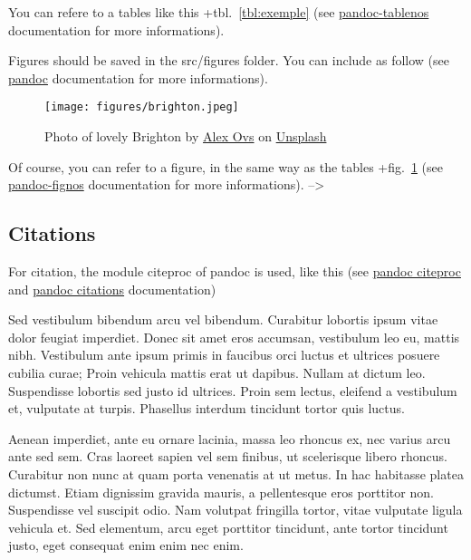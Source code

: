 \documentclass[9pt,biorxiv,doublespacing,lineno]{lapreprint}
\newcounter{tableno}
\begin{document}
You can refere to a tables like this +tbl.~\ref{tbl:exemple} (see
\href{https://github.com/tomduck/pandoc-tablenos}{pandoc-tablenos}
documentation for more informations).

Figures should be saved in the src/figures folder. You can include as
follow (see
\href{https://pandoc.org/MANUAL.html\#extension-implicit_figures}{pandoc}
documentation for more informations).

\begin{figure}
\hypertarget{fig:brighton}{%
\centering
\texttt{[image: figures/brighton.jpeg]}
\caption{Photo of lovely Brighton by
\href{https://unsplash.com/es/@sanekovs?utm_source=unsplash\&utm_medium=referral\&utm_content=creditCopyText}{Alex
Ovs} on
\href{https://unsplash.com/s/photos/brighton?utm_source=unsplash\&utm_medium=referral\&utm_content=creditCopyText}{Unsplash}}\label{fig:brighton}
}
\end{figure}

Of course, you can refer to a figure, in the same way as the tables
+fig.~\ref{fig:brighton} (see
\href{https://github.com/tomduck/pandoc-fignos}{pandoc-fignos}
documentation for more informations). --\textgreater{}

\hypertarget{citations}{%
\subsection{Citations}\label{citations}}

For citation, the module citeproc of pandoc is used, like this
\textcite{Bezuidenhout2021} (see
\href{https://pandoc.org/MANUAL.html\#citations}{pandoc citeproc} and
\href{https://pandoc.org/MANUAL.html\#extension-citations}{pandoc
citations} documentation)

Sed vestibulum bibendum arcu vel bibendum. Curabitur lobortis ipsum
vitae dolor feugiat imperdiet. Donec sit amet eros accumsan, vestibulum
leo eu, mattis nibh. Vestibulum ante ipsum primis in faucibus orci
luctus et ultrices posuere cubilia curae; Proin vehicula mattis erat ut
dapibus. Nullam at dictum leo. Suspendisse lobortis sed justo id
ultrices. Proin sem lectus, eleifend a vestibulum et, vulputate at
turpis. Phasellus interdum tincidunt tortor quis luctus.

Aenean imperdiet, ante eu ornare lacinia, massa leo rhoncus ex, nec
varius arcu ante sed sem. Cras laoreet sapien vel sem finibus, ut
scelerisque libero rhoncus. Curabitur non nunc at quam porta venenatis
at ut metus. In hac habitasse platea dictumst. Etiam dignissim gravida
mauris, a pellentesque eros porttitor non. Suspendisse vel suscipit
odio. Nam volutpat fringilla tortor, vitae vulputate ligula vehicula et.
Sed elementum, arcu eget porttitor tincidunt, ante tortor tincidunt
justo, eget consequat enim enim nec enim.
\end{document}

